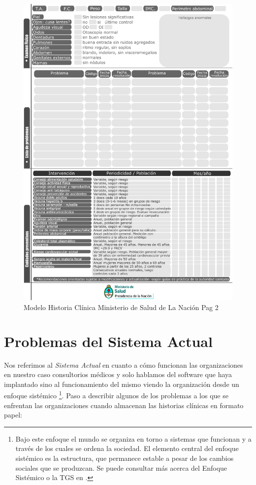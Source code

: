 \begin{figure}[H]
    \centering
    \includegraphics[scale=0.7]{resourse/historia-clinica-d.jpg}
    \caption{Modelo Historia Clínica Ministerio de Salud de La Nación Pag 2}
    \label{fig:07}
\end{figure}

\section{Problemas del Sistema Actual}

Nos referimos al \textit{Sistema Actual} en cuanto a cómo funcionan las organizaciones en nuestro caso consultorios médicos y solo hablamos del software que haya implantado sino al funcionamiento del mismo viendo la organización desde un enfoque sistémico \footnote{Bajo este enfoque el mundo se organiza en torno a sistemas que funcionan y a través de los cuales se ordena la sociedad. El elemento central del enfoque sistémico es la estructura, que permanece estable a pesar de los cambios sociales que se produzcan. Se puede consultar más acerca del Enfoque Sistémico o la TGS en \cite{EnfSys}.}. Paso a describir algunos de los problemas a los que se enfrentan las organizaciones cuando almacenan las historias clínicas en formato papel:

